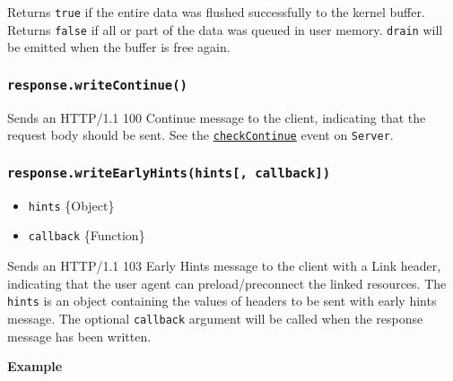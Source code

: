 Returns \texttt{true} if the entire data was flushed successfully to the
kernel buffer. Returns \texttt{false} if all or part of the data was
queued in user memory.
\texttt{\textquotesingle{}drain\textquotesingle{}} will be emitted when
the buffer is free again.

\subsubsection{\texorpdfstring{\texttt{response.writeContinue()}}{response.writeContinue()}}\label{response.writecontinue}

Sends an HTTP/1.1 100 Continue message to the client, indicating that
the request body should be sent. See the
\hyperref[event-checkcontinue]{\texttt{\textquotesingle{}checkContinue\textquotesingle{}}}
event on \texttt{Server}.

\subsubsection{\texorpdfstring{\texttt{response.writeEarlyHints(hints{[},\ callback{]})}}{response.writeEarlyHints(hints{[}, callback{]})}}\label{response.writeearlyhintshints-callback}

\begin{itemize}
\tightlist
\item
  \texttt{hints} \{Object\}
\item
  \texttt{callback} \{Function\}
\end{itemize}

Sends an HTTP/1.1 103 Early Hints message to the client with a Link
header, indicating that the user agent can preload/preconnect the linked
resources. The \texttt{hints} is an object containing the values of
headers to be sent with early hints message. The optional
\texttt{callback} argument will be called when the response message has
been written.

\textbf{Example}


